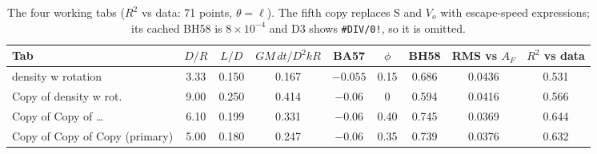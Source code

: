 \documentclass[10pt]{article}
\begin{document}
\begin{table}[H]\centering\small
\setlength{\tabcolsep}{4pt}\begin{tabular}{@{}lcccccccc@{}}\toprule
Tab & $D/R$ & $L/D$ & $GM\,dt/D^2kR$ & BA57 & $\phi$ & BH58 & RMS vs $A_F$ & $R^2$ vs data\\\midrule
density w rotation & 3.33 & 0.150 & 0.167 & $-0.055$ & 0.15 & 0.686 & 0.0436 & 0.531\\
Copy of density w rot. & 9.00 & 0.250 & 0.414 & $-0.06$ & 0 & 0.594 & 0.0416 & 0.566\\
Copy of Copy of \ldots & 6.10 & 0.199 & 0.331 & $-0.06$ & 0.40 & 0.745 & 0.0369 & 0.644\\
Copy of Copy of Copy (primary) & 5.00 & 0.180 & 0.247 & $-0.06$ & 0.35 & 0.739 & 0.0376 & 0.632\\\bottomrule
\end{tabular}
\caption{The four working tabs ($R^2$ vs data: 71 points, $\theta=\ell$). The fifth copy replaces S and $V_o$ with escape-speed expressions; its cached BH58 is $8\times10^{-4}$ and D3 shows \texttt{\#DIV/0!}, so it is omitted.}\label{tab:tabs}
\end{table}
\end{document}
